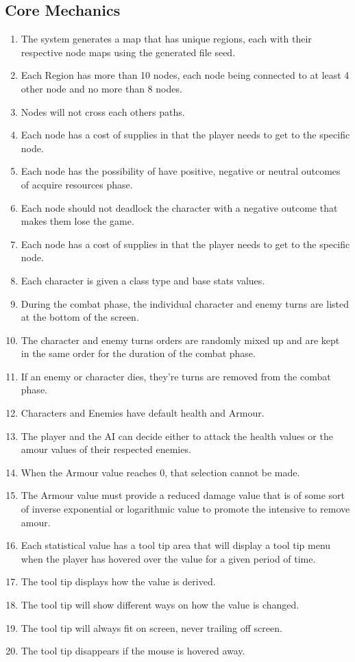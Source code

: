 \documentclass{article}
\begin{document}
\subsection{Core Mechanics}
\begin{enumerate}[{CMR}1. ]
	\item The system generates a map that has unique regions, each with their respective node maps using the generated file seed.
	\item Each Region has more than 10 nodes, each node being connected to at least 4 other node and no more than 8 nodes.
	\item Nodes will not cross each others paths.
	\item Each node has a cost of supplies in that the player needs to get to the specific node.
	\item Each node has the possibility of have positive, negative or neutral outcomes of acquire resources phase.
	\item Each node should not deadlock the character with a negative outcome that makes them lose the game.
	\item Each node has a cost of supplies in that the player needs to get to the specific node.
	\item Each character is given a class type and base stats values.
	\item During the combat phase, the individual character and enemy turns are listed at the bottom of the screen.
	\item The character and enemy turns orders are randomly mixed up and are kept in the same order for the duration of the combat phase.
	\item If an enemy or character dies, they're turns are removed from the combat phase.
	\item Characters and Enemies have default health and Armour.
	\item The player and the AI can decide either to attack the health values or the amour values of their respected enemies.
	\item When the Armour value reaches 0, that selection cannot be made.
	\item The Armour value must provide a reduced damage value that is of some sort of inverse exponential or logarithmic value to promote the intensive to remove amour.
	\item Each statistical value has a tool tip area that will display a tool tip menu when the player has hovered over the value for a given period of time.
	\item The tool tip displays how the value is derived.
	\item The tool tip will show different ways on how the value is changed.
	\item The tool tip will always fit on screen, never trailing off screen.
	\item The tool tip disappears if the mouse is hovered away.
\end{enumerate}
\end{document}

